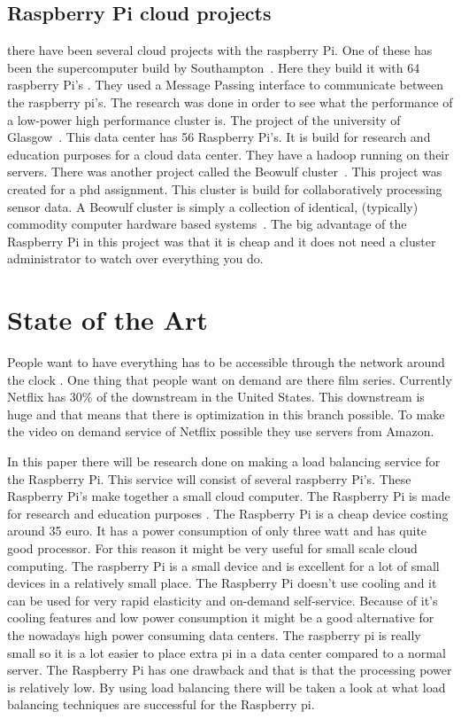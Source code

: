 \documentclass{sig-alternate-br}
\begin{document}
\subsection{Raspberry Pi cloud projects}
there have been several cloud projects with the raspberry Pi. \newline
One of these has been the supercomputer build by Southampton~\cite{cox:2014}. Here they build it with 64 raspberry Pi's . They used a Message Passing interface to communicate between the raspberry pi's. The research was done in order to see what the performance of a low-power high performance cluster is. \newline
The project of the university of Glasgow~\cite{tso:2013}. This data center has 56 Raspberry Pi's. It is build for research and education purposes for a cloud data center. They have a hadoop running on their servers. \newline
There was another project called the Beowulf cluster~\cite{beowolf-setup}. This project was created for a phd assignment. This cluster is build for collaboratively processing sensor data.  A Beowulf cluster is simply a collection
of identical, (typically) commodity computer hardware based systems~\cite{beowolf-setup}. The big advantage of the Raspberry Pi in this project was that it is cheap and it does not need a cluster administrator to watch over everything you do. 

\section{State of the Art}
 People want to have everything has to be accessible through the network around the clock \cite{youseff:2008}. One thing that people want on demand are there film series. Currently Netflix has 30\% of the downstream in the United States. This downstream is huge and that means that there is optimization in this branch possible. To make the video on demand service of Netflix possible they use servers from Amazon. 

In this paper there will be research done on making a load balancing service for the Raspberry Pi.  This service will consist of several raspberry Pi's. These Raspberry Pi's make together a small cloud computer.  The Raspberry Pi is made for research and education purposes \cite{raspberry-pi}. The Raspberry Pi is a cheap device costing around 35 euro. It has a power consumption of only three watt and has quite good processor. For this reason it might be very useful for small scale cloud computing. The raspberry Pi is a small device and is excellent for a lot of small devices in a relatively small place. The Raspberry Pi doesn't use cooling and it can be used for very rapid elasticity and on-demand self-service. Because of it's cooling features and low power consumption it might be a good alternative for the nowadays high power consuming data centers. The raspberry pi is really small so it is a lot easier to place extra pi in a data center compared to a normal server. The Raspberry Pi has one drawback and that is that the processing power is relatively low. By using load balancing there will be taken a look at what load balancing techniques are successful for the Raspberry pi. 
\end{document}
